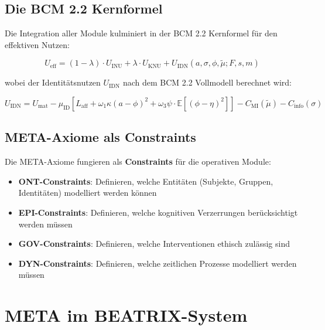 \documentclass[11pt,a4paper]{article}
\theoremstyle{definition}
\theoremstyle{plain}
\newcommand{\META}{\textsc{META}}
\begin{document}
\subsection{Die BCM 2.2 Kernformel}

Die Integration aller Module kulminiert in der BCM 2.2 Kernformel für den effektiven Nutzen:

\begin{equation}
U_{\text{eff}} = (1-\lambda) \cdot U_{\text{INU}} + \lambda \cdot U_{\text{KNU}} + U_{\text{IDN}}(a, \sigma, \phi, \tilde{\mu}; F, s, m)
\label{eq:bcm_core}
\end{equation}

wobei der Identitätsnutzen $U_{\text{IDN}}$ nach dem BCM 2.2 Vollmodell berechnet wird:

\begin{equation}
U_{\text{IDN}} = U_{\text{mat}} - \mu_{\text{ID}}\left[L_{\text{aff}} + \omega_1 \kappa (a - \phi)^2 + \omega_3 \psi \cdot \mathbb{E}[(\phi - \eta)^2]\right] - C_{\text{MI}}(\tilde{\mu}) - C_{\text{info}}(\sigma)
\end{equation}

\subsection{META-Axiome als Constraints}

Die \META-Axiome fungieren als \textbf{Constraints} für die operativen Module:

\begin{itemize}
    \item \textbf{ONT-Constraints}: Definieren, welche Entitäten (Subjekte, Gruppen, Identitäten) modelliert werden können
    \item \textbf{EPI-Constraints}: Definieren, welche kognitiven Verzerrungen berücksichtigt werden müssen
    \item \textbf{GOV-Constraints}: Definieren, welche Interventionen ethisch zulässig sind
    \item \textbf{DYN-Constraints}: Definieren, welche zeitlichen Prozesse modelliert werden müssen
\end{itemize}

\section{META im BEATRIX-System}
\end{document}

